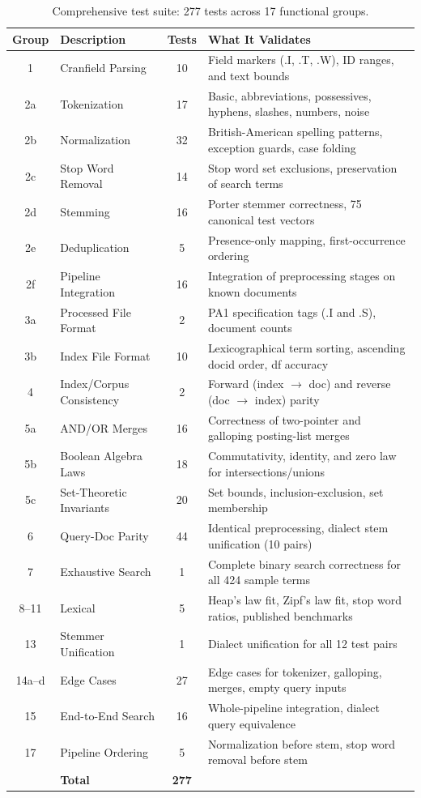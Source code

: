 \documentclass[12pt,a4paper]{article}
\begin{document}
\begin{table}[H]
\centering\small
\caption{Comprehensive test suite: 277 tests across 17 functional groups.}
\label{tab:tests}
\begin{tabular}{@{}c l c p{5.5cm}@{}}
\toprule
\textbf{Group} & \textbf{Description} & \textbf{Tests} & \textbf{What It Validates} \\
\midrule
1 & Cranfield Parsing & 10 & Field markers (.I, .T, .W), ID ranges, and text bounds \\
2a & Tokenization & 17 & Basic, abbreviations, possessives, hyphens, slashes, numbers, noise \\
2b & Normalization & 32 & British-American spelling patterns, exception guards, case folding \\
2c & Stop Word Removal & 14 & Stop word set exclusions, preservation of search terms \\
2d & Stemming & 16 & Porter stemmer correctness, 75 canonical test vectors \\
2e & Deduplication & 5 & Presence-only mapping, first-occurrence ordering \\
2f & Pipeline Integration & 16 & Integration of preprocessing stages on known documents \\
3a & Processed File Format & 2 & PA1 specification tags (.I and .S), document counts \\
3b & Index File Format & 10 & Lexicographical term sorting, ascending docid order, df accuracy \\
4 & Index/Corpus Consistency & 2 & Forward (index $\to$ doc) and reverse (doc $\to$ index) parity \\
5a & AND/OR Merges & 16 & Correctness of two-pointer and galloping posting-list merges \\
5b & Boolean Algebra Laws & 18 & Commutativity, identity, and zero law for intersections/unions \\
5c & Set-Theoretic Invariants & 20 & Set bounds, inclusion-exclusion, set membership \\
6 & Query-Doc Parity & 44 & Identical preprocessing, dialect stem unification (10 pairs) \\
7 & Exhaustive Search & 1 & Complete binary search correctness for all 424 sample terms \\
8--11 & Lexical & 5 & Heap's law fit, Zipf's law fit, stop word ratios, published benchmarks \\
13 & Stemmer Unification & 1 & Dialect unification for all 12 test pairs \\
14a--d & Edge Cases & 27 & Edge cases for tokenizer, galloping, merges, empty query inputs \\
15 & End-to-End Search & 16 & Whole-pipeline integration, dialect query equivalence \\
17 & Pipeline Ordering & 5 & Normalization before stem, stop word removal before stem \\
\midrule
& \textbf{Total} & \textbf{277} & \\
\bottomrule
\end{tabular}
\end{table}
\end{document}
